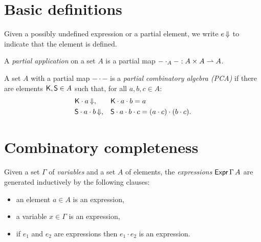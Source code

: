 %

\section{Basic definitions}

Given a possibly undefined expression or a partial element, we write $e\,{\Downarrow}$ to indicate that the element is defined.

\begin{definition}
  \label{def:PartialApplication}
  \leanok
  A \emph{partial application} on a set $A$ is a partial map ${-} \cdot_A {-} : A \times A \rightharpoonup A$.
\end{definition}

\begin{definition}
  \label{def:PCA}
  A set $A$ with a partial map ${-} \cdot {-}$ is a \emph{partial combinatory algebra (PCA)} if there are
  elements $\mathsf{K}, \mathsf{S} \in A$ such that, for all $a, b, c \in A$:
  \begin{align*}
    &\mathsf{K} \cdot a\,{\Downarrow}, &
    &\mathsf{K} \cdot a \cdot b = a \\
    &\mathsf{S} \cdot a \cdot b\,{\Downarrow}, &
    &\mathsf{S} \cdot a \cdot b \cdot c = (a \cdot c) \cdot (b \cdot c).
  \end{align*}
\end{definition}


\section{Combinatory completeness}


\begin{definition}
  \label{def:Expr}
  \leanok
  Given a set $\Gamma$ of \emph{variables} and a set $A$ of elements, the
  \emph{expressions} $\mathsf{Expr}\,\Gamma\,A$ are generated inductively by the following clauses:
  \begin{itemize}
    \item an element $a \in A$ is an expression,
    \item a variable $x \in \Gamma$ is an expression,
    \item if $e_1$ and $e_2$ are expressions then $e_1 \cdot e_2$ is an expression.
  \end{itemize}
\end{definition}

